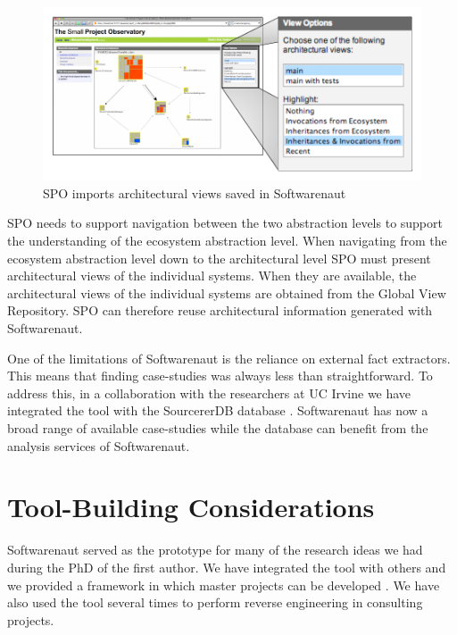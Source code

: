 \documentclass[preprint,12pt]{elsarticle}
\begin{document}
\begin{figure}[ht]
\begin{center}
\includegraphics[width=\linewidth]{SpoArchitectural}
\caption{SPO imports architectural views saved in Softwarenaut}
\label{}
\end{center}
\end{figure}

SPO needs to support navigation between the two abstraction levels to support the understanding of  the ecosystem abstraction level. When navigating from the ecosystem abstraction level down to the architectural level SPO must present architectural views of the individual systems. When they are available, the architectural views of the individual systems are obtained from the Global View Repository. SPO can therefore reuse architectural information generated with Softwarenaut.

One of the limitations of Softwarenaut is the reliance on external fact extractors. This means that finding case-studies was always less than straightforward. To address this, in a collaboration with the researchers at UC Irvine we have integrated the tool with the SourcererDB database \cite{linstead-sourcerer}. Softwarenaut has now a broad range of available case-studies while the database can benefit from the analysis services of Softwarenaut.

\section {Tool-Building Considerations} \label {sec:disc}

Softwarenaut served as the prototype for many of the research ideas we had during the PhD of the first author. We have integrated the tool with others \cite{lungu-clust, lungu-scico, nier-story} and we provided a framework in which master projects can be developed \cite{boeckmann-mars}. We have also used the tool several times to perform reverse engineering in consulting projects.
\end{document}
